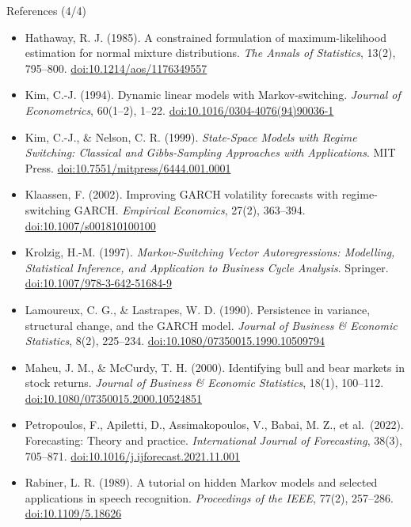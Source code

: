 \begin{frame}{References (4/4)}
\itemsize{\tiny}
\begin{itemize}
    \item Hathaway, R. J. (1985). A constrained formulation of maximum-likelihood estimation for normal mixture distributions. \textit{The Annals of Statistics}, 13(2), 795--800. \href{https://doi.org/10.1214/aos/1176349557}{doi:10.1214/aos/1176349557}
    \item Kim, C.-J. (1994). Dynamic linear models with Markov-switching. \textit{Journal of Econometrics}, 60(1--2), 1--22. \href{https://doi.org/10.1016/0304-4076(94)90036-1}{doi:10.1016/0304-4076(94)90036-1}
    \item Kim, C.-J., \& Nelson, C. R. (1999). \textit{State-Space Models with Regime Switching: Classical and Gibbs-Sampling Approaches with Applications}. MIT Press. \href{https://doi.org/10.7551/mitpress/6444.001.0001}{doi:10.7551/mitpress/6444.001.0001}
    \item Klaassen, F. (2002). Improving GARCH volatility forecasts with regime-switching GARCH. \textit{Empirical Economics}, 27(2), 363--394. \href{https://doi.org/10.1007/s001810100100}{doi:10.1007/s001810100100}
    \item Krolzig, H.-M. (1997). \textit{Markov-Switching Vector Autoregressions: Modelling, Statistical Inference, and Application to Business Cycle Analysis}. Springer. \href{https://doi.org/10.1007/978-3-642-51684-9}{doi:10.1007/978-3-642-51684-9}
    \item Lamoureux, C. G., \& Lastrapes, W. D. (1990). Persistence in variance, structural change, and the GARCH model. \textit{Journal of Business \& Economic Statistics}, 8(2), 225--234. \href{https://doi.org/10.1080/07350015.1990.10509794}{doi:10.1080/07350015.1990.10509794}
    \item Maheu, J. M., \& McCurdy, T. H. (2000). Identifying bull and bear markets in stock returns. \textit{Journal of Business \& Economic Statistics}, 18(1), 100--112. \href{https://doi.org/10.1080/07350015.2000.10524851}{doi:10.1080/07350015.2000.10524851}
    \item Petropoulos, F., Apiletti, D., Assimakopoulos, V., Babai, M. Z., et al.\ (2022). Forecasting: Theory and practice. \textit{International Journal of Forecasting}, 38(3), 705--871. \href{https://doi.org/10.1016/j.ijforecast.2021.11.001}{doi:10.1016/j.ijforecast.2021.11.001}
    \item Rabiner, L. R. (1989). A tutorial on hidden Markov models and selected applications in speech recognition. \textit{Proceedings of the IEEE}, 77(2), 257--286. \href{https://doi.org/10.1109/5.18626}{doi:10.1109/5.18626}

\end{itemize}
\end{frame}
